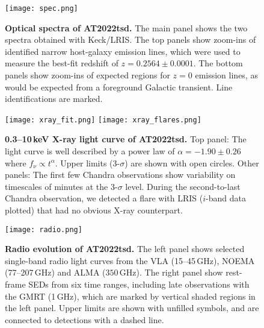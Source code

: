 \documentclass{nature_plusfigure}
\newcommand{\at}{AT2022tsd}
\begin{document}
\begin{extended_data}

\renewcommand{\thefigure}{\arabic{figure}~Extended~Data}
\renewcommand{\thefigure}{Extended Data Figure \arabic{figure}}
\renewcommand{\figurename}{}
\setcounter{figure}{0}

\renewcommand{\thetable}{\arabic{table}~Extended~Data}
\renewcommand{\thetable}{Extended Data Table \arabic{table}}
\renewcommand{\tablename}{}
\setcounter{table}{0}

\begin{figure}[ht]
 \centering
\texttt{[image: spec.png]}
  \caption{\textbf{Optical spectra of \at.} The main panel shows the two spectra obtained with Keck/LRIS. The top panels show zoom-ins of identified narrow host-galaxy emission lines, which were used to measure the best-fit redshift of $z=0.2564\pm0.0001$. The bottom panels show zoom-ins of expected regions for $z=0$ emission lines, as would be expected from a foreground Galactic transient. Line identifications are marked.}
 \label{fig:spec}
\end{figure}

\begin{figure}[!ht]
 \centering
\texttt{[image: xray\_fit.png]}
\texttt{[image: xray\_flares.png]}
  \caption{\textbf{0.3--10\,keV X-ray light curve of \at.} Top panel: The light curve is well described by a power law of $\alpha=-1.90\pm0.26$ where $f_\nu \propto t^{\alpha}$. Upper limits (3-$\sigma$) are shown with open circles. Other panels: The first few Chandra observations show variability on timescales of minutes at the 3-$\sigma$ level. During the second-to-last Chandra observation, we detected a flare with LRIS ($i$-band data plotted) that had no obvious X-ray counterpart.}
 \label{fig:xray-lc}
\end{figure}

\begin{figure}[!ht]
 \centering
\texttt{[image: radio.png]}
  \caption{\textbf{Radio evolution of \at.} The left panel shows selected single-band radio light curves from the VLA (15--45\,GHz), NOEMA (77--207\,GHz) and ALMA ($350$\,GHz). The right panel show rest-frame SEDs from six time ranges, including late observations with the GMRT (1\,GHz), which are marked by vertical shaded regions in the left panel. Upper limits are shown with unfilled symbols, and are connected to detections with a dashed line.}
 \label{fig:radio}
\end{figure}


\end{extended_data}
\end{document}

